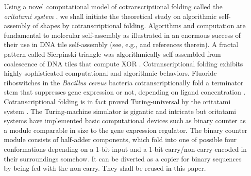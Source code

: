 Using a novel computational model of cotranscriptional folding called the \textit{oritatami system} \cite{GeMeScSe2016}, we shall initiate the theoretical study on algorithmic self-assembly of shapes by cotranscriptional folding. 
Algorithms and computation are fundamental to molecular self-assembly as illustrated in an enormous success of their use in DNA tile self-assembly (see, e.g., \cite{Doty2012,Patitz2016,WinfreePhD} and references therein). 
A fractal pattern called Sierpinski triangle was algorithmically self-assembled from coalescence of DNA tiles that compute XOR \cite{RothemundPapadakisWinfree2004}. 
Cotranscriptional folding exhibits highly sophisticated computational and algorithmic behaviors. 
Fluoride riboswitches in the \textit{Bacillus cereus} bacteria cotranscriptionally fold a terminator stem that suppresses gene expression or not, depending on ligand concentration \cite{WaStYuLiLu2016}. 
Cotranscriptional folding is in fact proved Turing-universal by the oritatami system \cite{GeMeScSe2015}. 
The Turing-machine simulator is gigantic and intricate but oritatami systems have implemented basic computational devices such as binary counter \cite{GeMeScSe2016} as a module comparable in size to the gene expression regulator. 
The binary counter module consists of half-adder components, which fold into one of possible four conformations depending on a 1-bit input and a 1-bit carry/non-carry encoded in their surroundings somehow. 
It can be diverted as a copier for binary sequences by being fed with the non-carry. 
They shall be reused in this paper. 

